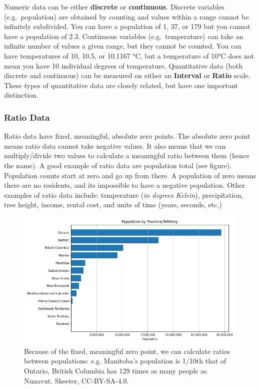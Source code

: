 \documentclass[
]{book}
\begin{document}
Numeric data can be either \textbf{discrete} or \textbf{continuous}. Discrete variables (e.g.~population) are obtained by counting and values within a range cannot be infinitely subdivided. You can have a population of 1, 37, or 179 but you cannot have a population of 2.3. Continuous variables (e.g.~temperature) can take an infinite number of values a given range, but they cannot be counted. You can have temperatures of 10, 10.5, or 10.1167 °C, but a temperature of 10°C does not mean you have 10 individual degrees of temperature. Quantitative data (both discrete and continuous) can be measured on either an \textbf{Interval} or \textbf{Ratio} scale. These types of quantitative data are closely related, but have one important distinction.

\hypertarget{ratio-data}{%
\subsubsection{Ratio Data}\label{ratio-data}}

Ratio data have fixed, meaningful, absolute zero points. The absolute zero point means ratio data cannot take negative values. It also means that we can multiply/divide two values to calculate a meaningful ratio between them (hence the name). A good example of ratio data are population total (see figure). Population counts start at zero and go up from there. A population of zero means there are no residents, and its impossible to have a negative population. Other examples of ratio data include: temperature (\emph{in degrees Kelvin}), precipitation, tree height, income, rental cost, and units of time (years, seconds, etc.)

\begin{figure}
\includegraphics[width=0.75\linewidth]{images/03-ratio-population} \caption{Because of the fixed, meaningful zero point, we can calculate ratios between populations: e.g. Manitoba's population is 1/10th that of Ontario, British Columbia has 129 times as many people as Nunavut. Skeeter, CC-BY-SA-4.0.}\label{fig:3-ratio-population}
\end{figure}
\end{document}
